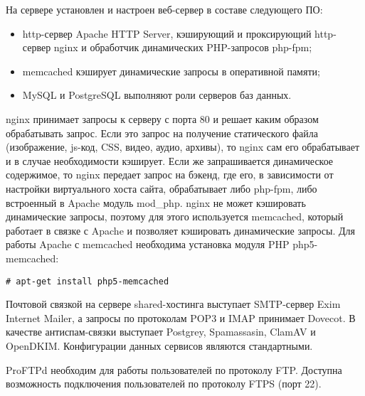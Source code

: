 На сервере установлен и настроен веб-сервер в составе следующего ПО:
\begin{itemize}
  \item http-сервер Apache HTTP Server, кэширующий и проксирующий http-сервер nginx и обработчик динамических PHP-запросов php-fpm;
  \item memcached кэширует динамические запросы в оперативной памяти;
  \item MySQL и PostgreSQL выполняют роли серверов баз данных.
\end{itemize}

nginx принимает запросы к серверу с порта 80 и решает каким образом обрабатывать запрос.
Если это запрос на получение статического файла (изображение, js-код, CSS, видео, аудио, архивы), то nginx сам его обрабатывает и в случае необходимости кэширует.
Если же запрашивается динамическое содержимое, то nginx передает запрос на бэкенд, где его, в зависимости от настройки виртуального хоста сайта, обрабатывает либо php-fpm, либо встроенный в Apache модуль mod\_php.
nginx не может кэшировать динамические запросы, поэтому для этого используется memcached, который работает в связке с Apache и позволяет кэшировать динамические запросы.
Для работы Apache с memcached необходима установка модуля PHP php5-memcached:
\begin{lstlisting}
# apt-get install php5-memcached
\end{lstlisting}

Почтовой связкой на сервере shared-хостинга выступает SMTP-сервер Exim Internet Mailer, а запросы по протоколам POP3 и IMAP принимает Dovecot.
В качестве антиспам-связки выступает Postgrey, Spamassasin, ClamAV и OpenDKIM.
Конфигурации данных сервисов являются стандартными.

ProFTPd необходим для работы пользователей по протоколу FTP.
Доступна возможность подключения пользователей по протоколу FTPS (порт 22).

